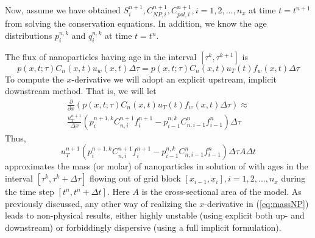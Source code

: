 Now, assume we have obtained $S^{n+1}_{i}, C^{n+1}_{\textit{NP}, i}, C^{n+1}_{pol, i}, i=1,2,...,n_x$ at time $t=t^{n+1}$ from solving the conservation equations. In addition, we know the age distributions $p^{n,k}_i$ and $q^{n,k}_i$ at time $t=t^{n}$.

The flux of nanoparticles having age in the interval $\left[\tau^k, \tau^{k+1}\right]$ is
\begin{equation}
    p(x,t;\tau)C_n(x,t)u_w(x,t)\Delta\tau = p(x,t;\tau)C_n(x,t)u_T(t)f_w(x,t)\Delta\tau
\end{equation}
To compute the  $x$-derivative we will adopt an explicit upstream, implicit downstream method. That is, we will let
\begin{multline}
    \frac{\partial}{\partial x} \left(p(x,t;\tau)C_n(x,t)u_T(t)f_w(x,t)\Delta\tau\right) \approx \\ \frac{u_T^{n+1}}{\Delta x} \left(p_i^{n+1,k}C_{n,i}^{n+1}f_i^{n+1}- p_{i-1}^{n,k}C_{n,i-1}^{n}f_{i-1}^{n}\right)\Delta\tau
\end{multline}
Thus,
\begin{equation} \label{eq:massNP} %
    u_T^{n+1} \left(p_i^{n+1,k}C_{n,i}^{n+1}f_i^{n+1}- p_{i-1}^{n,k}C_{n,i-1}^{n}f_{i-1}^{n}\right)\Delta\tau A\Delta t
\end{equation}
approximates the mass (or molar) of nanoparticles in solution of with ages in the interval $\left[\tau^k, \tau^k+\Delta\tau\right]$  flowing out of grid block $\left[x_{i-1},x_i\right],i=1,2,...,n_x$ during the time step  $\left[t^n, t^n+\Delta t\right]$. Here $A$ is the cross-sectional area of the model. As previously discussed, any other way of realizing the  $x$-derivative in (\ref{eq:massNP}) leads to non-physical results, either highly unstable (using explicit both up- and downstream) or forbiddingly dispersive (using a full implicit formulation). 


